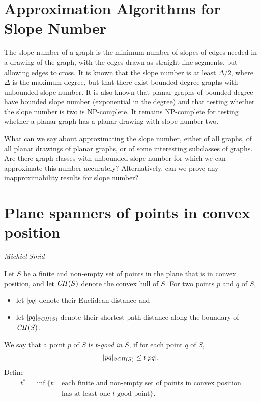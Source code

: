 \documentclass{patmorin}
\begin{document}
\section{Approximation Algorithms for Slope Number}

The slope number of a graph is the minimum number of slopes of edges
needed in a drawing of the graph, with the edges drawn as straight line
segments, but allowing edges to cross. It is known that the slope number
is at least $\Delta/2$, where $\Delta$ is the maximum degree, but that
there exist bounded-degree graphs with unbounded slope number. It is
also known that planar graphs of bounded degree have bounded slope number
(exponential in the degree) and that testing whether the slope number is
two is NP-complete. It remains NP-complete for testing whether a planar
graph has a planar drawing with slope number two.

\begin{op}
  What can we say about approximating the slope number, either of all
  graphs, of all planar drawings of planar graphs, or of some interesting
  subclasses of graphs. Are there graph classes with unbounded slope number
  for which we can approximate this number accurately? Alternatively,
  can we prove any inapproximability results for slope number?
\end{op}

\section{Plane spanners of points in convex position} 

\newcommand{\CH}{\mathord{\it CH}}

\emph{Michiel Smid} 

Let $S$ be a finite and non-empty set of points in the plane that is in 
convex position, and let $\CH(S)$ denote the convex hull of $S$. 
For two points $p$ and $q$ of $S$, 
\begin{itemize}
\item let $|pq|$ denote their Euclidean distance and 
\item let $|pq|_{\partial \CH(S)}$ denote their shortest-path distance 
      along the boundary of $\CH(S)$. 
\end{itemize} 
We say that a point $p$ of $S$ is $t$-\emph{good in} $S$, if for each 
point $q$ of $S$, 
\[ |pq|_{\partial \CH(S)} \leq t |pq| . 
\]
Define 
\[ \begin{array}{ll} 
       t^* = \inf \{ t : & \mbox{each finite and non-empty set of 
                                 points in convex position} \\ 
         & \mbox{has at least one $t$-good point} \} .
   \end{array} 
\]   
\end{document}

